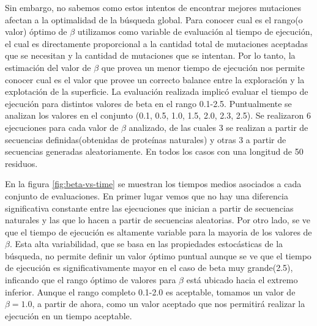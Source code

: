 Sin embargo, no sabemos como estos intentos de encontrar mejores mutaciones afectan a la optimalidad de la búsqueda global.
Para conocer cual es el rango(o valor) óptimo de $\beta$ utilizamos como variable de evaluación al tiempo de ejecución, 
el cual es directamente proporcional a la cantidad total de mutaciones aceptadas que se necesitan y la cantidad de mutaciones que se intentan.
Por lo tanto, la estimación del valor de $\beta$ que provea un menor tiempo de ejecución nos permite conocer cual es el valor que provee un correcto balance entre la exploración y la explotación de la superficie.
La evaluación realizada implicó evaluar el tiempo de ejecución para distintos valores de beta en el rango 0.1-2.5.
Puntualmente se analizan los valores en el conjunto (0.1, 0.5, 1.0, 1.5, 2.0, 2.3, 2.5). 
Se realizaron 6 ejecuciones para cada valor de $\beta$ analizado, de las cuales 3 se realizan a partir de secuencias definidas(obtenidas de proteínas naturales) y otras 3 a partir de secuencias generadas aleatoriamente.
En todos los casos con una longitud de 50 residuos.

En la figura \ref{fig:beta-vs-time} se muestran los tiempos medios asociados a cada conjunto de evaluaciones.
En primer lugar vemos que no hay una diferencia significativa constante entre las ejecuciones que inician a partir de secuencias naturales y las que lo hacen a partir de secuencias aleatorias.
Por otro lado, se ve que el tiempo de ejecución es altamente variable para la mayoria de los valores de $\beta$.
Esta alta variabilidad, que se basa en las propiedades estocásticas de la búsqueda, no permite definir un valor óptimo puntual aunque se ve que el tiempo de ejecución es significativamente mayor en el caso de beta muy grande(2.5), 
inficando que el rango óptimo de valores para $\beta$ está ubicado hacia el extremo inferior.
Aunque el rango completo 0.1-2.0 es aceptable, tomamos un valor de $\beta=1.0$, a partir de ahora, como un valor aceptado que nos permitirá realizar la ejecución en un tiempo aceptable.



